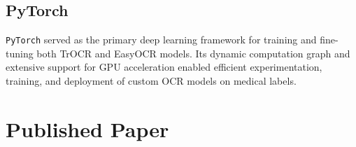 \subsection{PyTorch}
\texttt{PyTorch} served as the primary deep learning framework for training and fine-tuning both TrOCR and EasyOCR models. Its dynamic computation graph and extensive support for GPU acceleration enabled efficient experimentation, training, and deployment of custom OCR models on medical labels.

\section{Published Paper}

